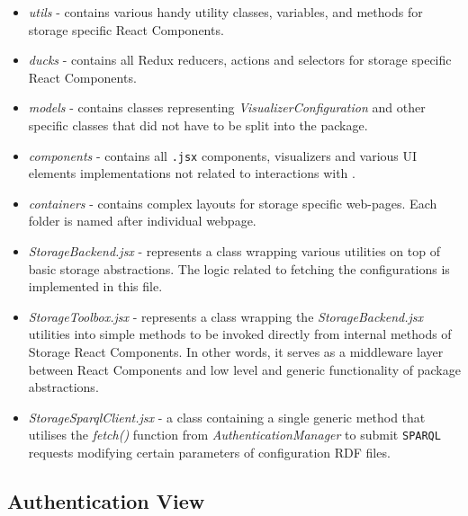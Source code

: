\begin{itemize}
    \item \textit{utils} - contains various handy utility classes, variables, and methods for storage specific React Components.
    \item \textit{ducks} - contains all Redux reducers, actions and selectors for storage specific React Components. 
    \item \textit{models} - contains classes representing \textit{VisualizerConfiguration} and other \lpa{} specific classes that did not have to be split into the \lpas{} package.
    \item \textit{components} - contains all \texttt{.jsx} components, visualizers and various UI elements implementations not related to interactions with \solid{}.
    \item \textit{containers} - contains complex layouts for storage specific web-pages. Each folder is named after individual webpage.     
    \item \textit{StorageBackend.jsx} - represents a class wrapping various utilities on top of basic \lpas{} storage abstractions. The logic related to fetching the \lpa{} configurations is implemented in this file.
    \item \textit{StorageToolbox.jsx} - represents a class wrapping the \textit{StorageBackend.jsx} utilities into simple methods to be invoked directly from internal methods of Storage React Components. In other words, it serves as a middleware layer between React Components and low level and generic functionality of \lpas{} package abstractions.
    \item \textit{StorageSparqlClient.jsx} - a class containing a single generic method that utilises the \textit{fetch()} function from \textit{AuthenticationManager} to submit \texttt{SPARQL} requests modifying certain parameters of \lpa{} configuration RDF files. 
\end{itemize}

\subsection{Authentication View}
\label{sssec:authentication_view_implementation}


